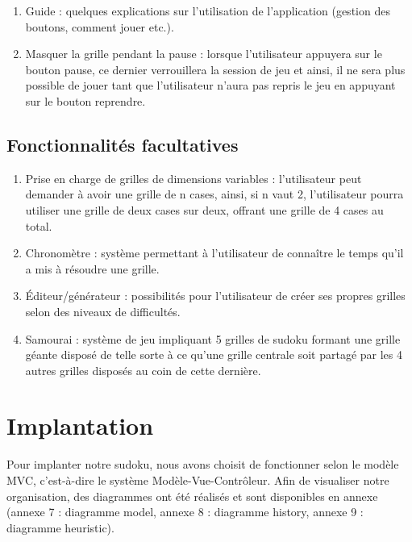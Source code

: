 \begin{enumerate}
  \item Guide : quelques explications sur l'utilisation de l'application 
  (gestion des boutons, comment jouer etc.).\\
 
  \item Masquer la grille pendant la pause : lorsque l'utilisateur appuyera sur le bouton pause, 
  ce dernier verrouillera la session de jeu et ainsi, 
  il ne sera plus possible de jouer tant que l'utilisateur 
  n'aura pas repris le jeu en appuyant sur le bouton reprendre. \\
\end{enumerate}
 
\subsection{Fonctionnalités facultatives}

\begin{enumerate}
  \item Prise en charge de grilles de dimensions variables : 
  l'utilisateur peut demander à avoir une grille de n cases, ainsi,
  si n vaut 2, l'utilisateur pourra utiliser une grille de deux cases sur deux, 
  offrant une grille de 4 cases au total.   \\

 \item Chronomètre : système permettant à l'utilisateur de connaître 
 le temps qu'il a mis à résoudre une grille.  \\
 
 \item Éditeur/générateur : possibilités pour l'utilisateur 
 de créer ses propres grilles selon des niveaux de difficultés. \\
 
 \item Samourai : système de jeu impliquant 5 grilles de sudoku formant une grille géante 
 disposé de telle sorte à ce qu'une grille centrale soit partagé 
 par les 4 autres grilles disposés au coin de cette dernière.  \\
\end{enumerate}

\section{Implantation}
Pour implanter notre sudoku, nous avons choisit de fonctionner selon le modèle MVC, 
c'est-à-dire le système Modèle-Vue-Contrôleur. Afin de visualiser notre organisation, 
des diagrammes ont été réalisés et sont disponibles en annexe 
(annexe 7 : diagramme model,
annexe 8 : diagramme history,
annexe 9 : diagramme heuristic).

